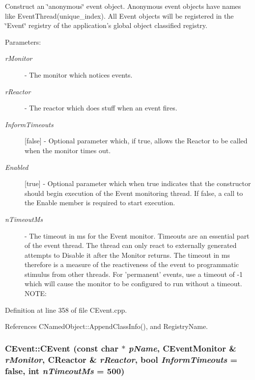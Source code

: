 Construct an \char`\"{}anonymous\char`\"{} event object. Anonymous event objects have names like Event\-Thread(unique\_\-index). All Event objects will be registered in the \char`\"{}Event\char`\"{} registry of the application's global  object classified registry.\begin{Desc}
\item[Parameters: ]\par
\begin{description}
\item[{\em 
r\-Monitor}]- The monitor which notices events. \item[{\em 
r\-Reactor}]- The reactor which does stuff when an event fires. \item[{\em 
Inform\-Timeouts}][false] - Optional parameter which, if true, allows the Reactor to be called when the monitor times out. \item[{\em 
Enabled}][true] - Optional parameter which when true indicates that the constructor should begin execution of the Event monitoring thread. If false, a call to the Enable member is required to start execution. \item[{\em 
n\-Timeout\-Ms}]- The timeout in ms for the Event monitor. Timeouts are an essential part of the event thread. The thread can only react to externally generated attempts to Disable it after the Monitor returns. The timeout in ms therefore is a measure of the  reactiveness of the event to programmatic stimulus from other threads. For 'permanent' events, use a timeout of -1 which will cause the monitor to be configured to run without a timeout. NOTE:
\end{description}
\end{Desc}


Definition at line 358 of file CEvent.cpp.

References CNamed\-Object::Append\-Class\-Info(), and Registry\-Name.
\subsubsection{\setlength{\rightskip}{0pt plus 5cm}CEvent::CEvent (const char $\ast$ {\em p\-Name}, {\bf CEvent\-Monitor} \& {\em r\-Monitor}, {\bf CReactor} \& {\em r\-Reactor}, bool {\em Inform\-Timeouts} = false, int {\em n\-Timeout\-Ms} = 500)}\label{classCEvent_a1}


